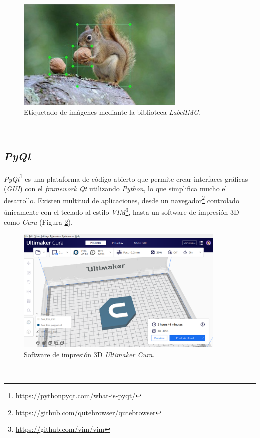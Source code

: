 \begin{figure} [h!]
	\begin{center}
		\includegraphics[width=8cm]{figs/labelimg}
	\end{center}
	\caption{Etiquetado de imágenes mediante la biblioteca \textit{LabelIMG}.}
	\label{fig:labelimg}
\end{figure}\


\subsection{\textit{PyQt}}
\label{subsection:pyqt}
\textit{PyQt}\footnote{\url{https://pythonpyqt.com/what-is-pyqt/}} es una plataforma de código abierto que permite crear interfaces gráficas (\textit{GUI}) con el \textit{framework Qt} utilizando \textit{Python}, lo que simplifica mucho el desarrollo. Existen multitud de aplicaciones, desde un navegador\footnote{\url{https://github.com/qutebrowser/qutebrowser}} controlado únicamente con el teclado al estilo \textit{VIM}\footnote{\url{https://github.com/vim/vim}}, hasta un software de impresión 3D como \textit{Cura} (Figura \ref{fig:cura}).\\

\begin{figure} [h!]
	\begin{center}
		\includegraphics[width=10cm]{figs/cura}
	\end{center}
	\caption{Software de impresión 3D \textit{Ultimaker Cura}.}
	\label{fig:cura}
\end{figure}\

